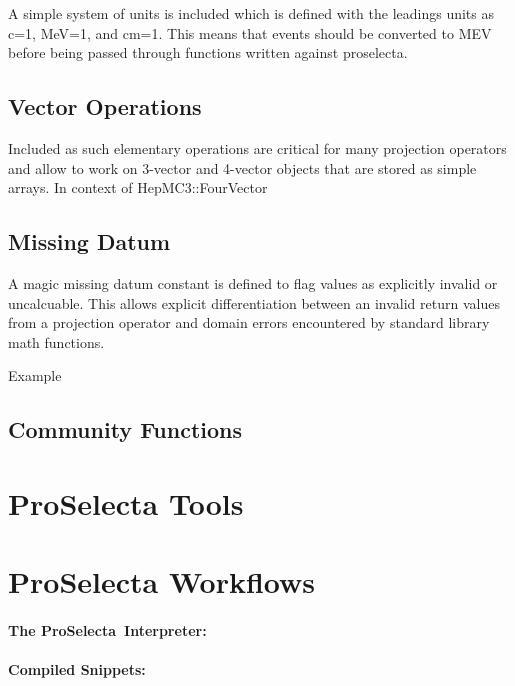 \documentclass{SciPost}
\newcommand{\proselecta}{{\sc ProSelecta}}
\begin{document}
A simple system of units is included which is defined with the leadings units as c=1, MeV=1, and cm=1. This means that events should be converted to MEV before being passed through functions written against proselecta.

\subsection{Vector Operations}

Included as such elementary operations are critical for many projection operators and allow to work on 3-vector and 4-vector objects that are stored as simple arrays. In context of HepMC3::FourVector


\subsection{Missing Datum}

A magic missing datum constant is defined to flag values as explicitly invalid or uncalcuable. This allows explicit differentiation between an invalid return values from a projection operator and domain errors encountered by standard library math functions.

Example

\subsection{Community Functions}

\section{\proselecta{} Tools}
\label{sec:tools}

\section{\proselecta{} Workflows}
\label{ssec:wf}

\paragraph{The \proselecta\ Interpreter:}

\paragraph{Compiled Snippets:}
\end{document}
